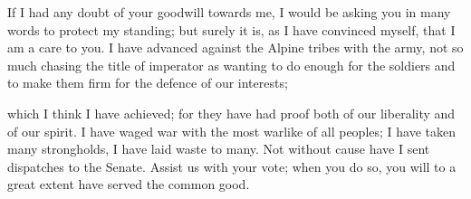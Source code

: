 

 If I had any doubt of your goodwill towards me, I would be asking you in many words to protect my standing; but surely it is, as I have convinced myself, that I am a care to you. I have advanced against the Alpine tribes with the army, not so much chasing the title of imperator as wanting to do enough for the soldiers and to make them firm for the defence of our interests;

 which I think I have achieved; for they have had proof both of our liberality and of our spirit. I have waged war with the most warlike of all peoples; I have taken many strongholds, I have laid waste to many. Not without cause have I sent dispatches to the Senate. Assist us with your vote; when you do so, you will to a great extent have served the common good.
